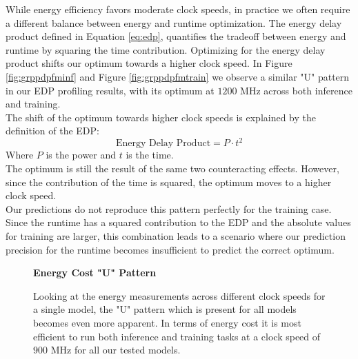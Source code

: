 While energy efficiency favors moderate clock speeds, in practice we often require a different balance between energy and runtime optimization. The energy delay product defined in Equation \ref{eq:edp}, quantifies the tradeoff between energy and runtime by squaring the time contribution. Optimizing for the energy delay product shifts our optimum towards a higher clock speed. In Figure \ref{fig:grppdpfminf} and Figure \ref{fig:grppdpfmtrain} we observe a similar "U" pattern in our EDP profiling results, with its optimum at $1200$ MHz across both inference and training. \\
The shift of the optimum towards higher clock speeds is explained by the definition of the EDP: 
\begin{equation}\label{eq:edp}
    \text{Energy Delay Product} = P \cdot t^2
\end{equation}
Where $P$ is the power and $t$ is the time. \\
The optimum is still the result of the same two counteracting effects. However, since the contribution of the time is squared, the optimum moves to a higher clock speed. \\
Our predictions do not reproduce this pattern perfectly for the training case. Since the runtime has a squared contribution to the EDP and the absolute values for training are larger, this combination leads to a scenario where our prediction precision for the runtime becomes insufficient to predict the correct optimum. 






\begin{figure}[htbp]
    \centering
    \parbox{0.7\textwidth}{\centering\textbf{Energy Cost "U" Pattern}}
    \caption{Looking at the energy measurements across different clock speeds for a single model, the "U" pattern which is present for all models becomes even more apparent. In terms of energy cost it is most efficient to run both inference and training tasks at a clock speed of $900$ MHz for all our tested models.}
    \label{fig:pattern}
\end{figure}

